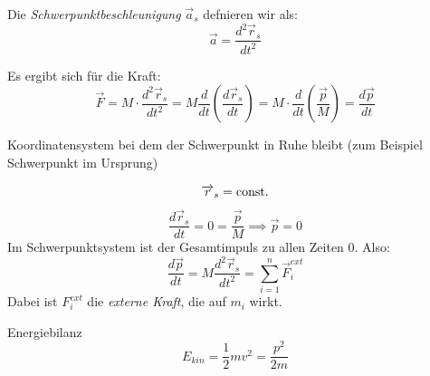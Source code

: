 \documentclass[a4paper,10pt]{scrartcl}
\begin{document}
\begin{df}[Schwerpunktbeschleunigung]
 Die \emph{Schwerpunktbeschleunigung} $\vec a_s$ defnieren wir als:
\[
 \vec a=\frac{d^2\vec r_s}{dt^2}
\]
\end{df}
Es ergibt sich für die Kraft:
\[
 \vec F=M\cdot \frac{d^2 \vec r_s}{dt^2}=M\frac{d}{dt}(\frac{d\vec r_s}{dt})=M\cdot \frac{d}{dt} (\frac{\vec p}{M})=\frac{d\vec p}{dt}
\]
\begin{df}
 Koordinatensystem bei dem der Schwerpunkt in Ruhe bleibt (zum Beispiel Schwerpunkt im Ursprung)
\end{df}
\[\overrightarrow{r}_s=\text{const}.\]
\[
 \frac{d\vec r_s}{dt}=0=\frac{\vec p}{M}\implies \vec p=0
\]
Im Schwerpunktsystem ist der Gesamtimpuls zu allen Zeiten 0. Also:
\[
 \frac{d\vec p}{dt}=M\frac{d^2\vec r_s}{dt^2}=\sum_{i=1}^n \vec F_i^{ext}
\]
Dabei ist $F_i^{ext}$ die \emph{externe Kraft}, die auf $m_i$ wirkt.
\begin{seg}{Energiebilanz}
 \[
  E_{kin}=\frac{1}{2} m v^2=\frac{p^2}{2m}
 \]

\end{seg}
\end{document}

